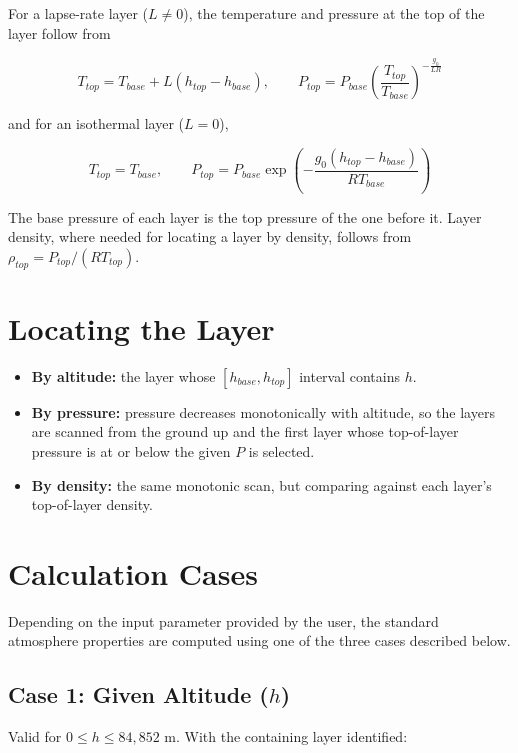 For a lapse-rate layer ($L\neq0$), the temperature and pressure at the top
of the layer follow from

\begin{equation}
T_{top} = T_{base} + L(h_{top}-h_{base}), \qquad
P_{top} = P_{base}\left(\frac{T_{top}}{T_{base}}\right)^{-\frac{g_0}{LR}}
\end{equation}

and for an isothermal layer ($L=0$),

\begin{equation}
T_{top} = T_{base}, \qquad
P_{top} = P_{base}\exp\left(-\frac{g_0(h_{top}-h_{base})}{RT_{base}}\right)
\end{equation}

The base pressure of each layer is the top pressure of the one before it.
Layer density, where needed for locating a layer by density, follows from
$\rho_{top} = P_{top}/(RT_{top})$.

\section{Locating the Layer}

\begin{itemize}[nosep]
    \item \textbf{By altitude:} the layer whose $[h_{base}, h_{top}]$
    interval contains $h$.
    \item \textbf{By pressure:} pressure decreases monotonically with
    altitude, so the layers are scanned from the ground up and the first
    layer whose top-of-layer pressure is at or below the given $P$ is
    selected.
    \item \textbf{By density:} the same monotonic scan, but comparing
    against each layer's top-of-layer density.
\end{itemize}

\section{Calculation Cases}

Depending on the input parameter provided by the user, the standard atmosphere properties are computed using one of the three cases described below.

\subsection*{Case 1: Given Altitude ($h$)}

Valid for $0 \le h \le 84{,}852$ m. With the containing layer identified:

